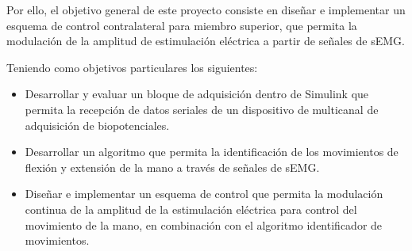 


Por ello, el objetivo general de este proyecto consiste en diseñar e implementar un esquema de control contralateral para miembro superior, que permita la modulación de la amplitud de estimulación eléctrica a partir de señales de sEMG.

Teniendo como objetivos particulares los siguientes:

\begin{itemize}
	\item Desarrollar y evaluar un bloque de adquisición dentro de Simulink que permita la recepción de datos seriales de un dispositivo de multicanal de adquisición de biopotenciales.
	\item Desarrollar un algoritmo que permita la identificación de los movimientos de flexión y extensión de la mano a través de señales de sEMG.
	\item Diseñar e implementar un esquema de control que permita la modulación continua de la amplitud de la estimulación eléctrica para control del movimiento de la mano, en combinación con el algoritmo identificador de movimientos.
\end{itemize}
